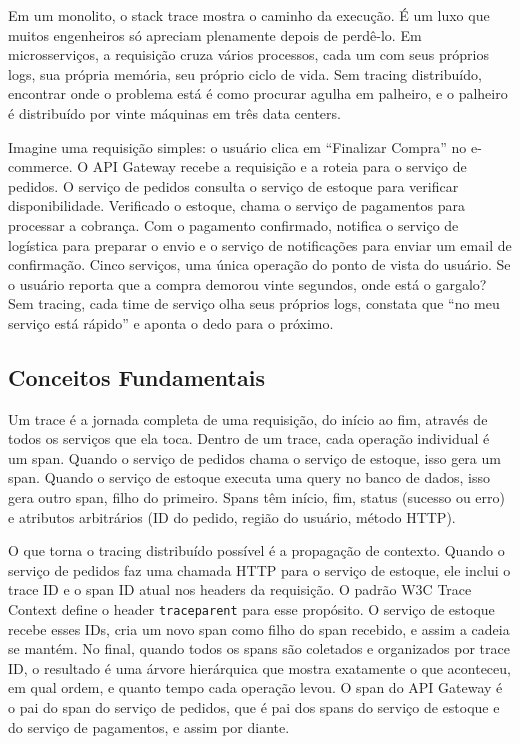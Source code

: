 Em um monolito, o stack trace mostra o caminho da execução. É um luxo que muitos
engenheiros só apreciam plenamente depois de perdê-lo. Em microsserviços, a
requisição cruza vários processos, cada um com seus próprios logs, sua própria
memória, seu próprio ciclo de vida. Sem tracing distribuído, encontrar onde o
problema está é como procurar agulha em palheiro, e o palheiro é distribuído
por vinte máquinas em três data centers.

Imagine uma requisição simples: o usuário clica em ``Finalizar Compra'' no
e-commerce. O API Gateway recebe a requisição e a roteia para o serviço de
pedidos. O serviço de pedidos consulta o serviço de estoque para verificar
disponibilidade. Verificado o estoque, chama o serviço de pagamentos para
processar a cobrança. Com o pagamento confirmado, notifica o serviço de
logística para preparar o envio e o serviço de notificações para enviar um
email de confirmação. Cinco serviços, uma única operação do ponto de vista do
usuário. Se o usuário reporta que a compra demorou vinte segundos, onde está
o gargalo? Sem tracing, cada time de serviço olha seus próprios logs, constata
que ``no meu serviço está rápido'' e aponta o dedo para o próximo.

\subsection{Conceitos Fundamentais}

Um trace é a jornada completa de uma requisição, do início ao fim, através de
todos os serviços que ela toca. Dentro de um trace, cada operação individual é
um span. Quando o serviço de pedidos chama o serviço de estoque, isso gera um
span. Quando o serviço de estoque executa uma query no banco de dados, isso gera
outro span, filho do primeiro. Spans têm início, fim, status (sucesso ou erro)
e atributos arbitrários (ID do pedido, região do usuário, método HTTP).

O que torna o tracing distribuído possível é a propagação de contexto. Quando o
serviço de pedidos faz uma chamada HTTP para o serviço de estoque, ele inclui o
trace ID e o span ID atual nos headers da requisição. O padrão W3C Trace Context
define o header \texttt{traceparent} para esse propósito. O serviço de estoque
recebe esses IDs, cria um novo span como filho do span recebido, e assim a
cadeia se mantém. No final, quando todos os spans são coletados e organizados
por trace ID, o resultado é uma árvore hierárquica que mostra exatamente o que
aconteceu, em qual ordem, e quanto tempo cada operação levou. O span do API
Gateway é o pai do span do serviço de pedidos, que é pai dos spans do serviço
de estoque e do serviço de pagamentos, e assim por diante.

